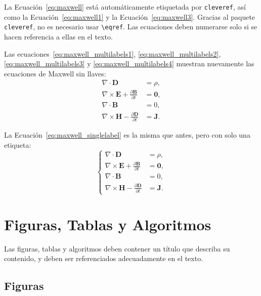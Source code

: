\documentclass[11pt,a4paper]{article}
\begin{document}
La Ecuación~\eqref{eq:maxwell} está automáticamente etiquetada por \texttt{cleveref},
así como la Ecuación~\eqref{eq:maxwell1} y la Ecuación~\eqref{eq:maxwell3}.
Gracias al paquete \verb|cleveref|, no es necesario usar \verb|\eqref|.
Las ecuaciones deben numerarse solo si se hacen referencia a ellas en el texto.

Las ecuaciones~\eqref{eq:maxwell_multilabels1}, \eqref{eq:maxwell_multilabels2}, \eqref{eq:maxwell_multilabels3} y \eqref{eq:maxwell_multilabels4} muestran nuevamente las ecuaciones de Maxwell sin llaves:
\begin{align}
    \nabla\cdot \bm{D} & = \rho, \label{eq:maxwell_multilabels1} \\
    \nabla \times \bm{E} +  \frac{\partial \bm{B}}{\partial t} &= \bm{0}, \label{eq:maxwell_multilabels2} \\
    \nabla\cdot \bm{B} & = 0, \label{eq:maxwell_multilabels3} \\
    \nabla \times \bm{H} - \frac{\partial \bm{D}}{\partial t} &= \bm{J} \label{eq:maxwell_multilabels4}.
\end{align}

La Ecuación~\eqref{eq:maxwell_singlelabel} es la misma que antes,
pero con solo una etiqueta:
\begin{equation}
    \label{eq:maxwell_singlelabel}
    \left\{
    \begin{aligned}
    \nabla\cdot \bm{D} & = \rho, \\
    \nabla \times \bm{E} +  \frac{\partial \bm{B}}{\partial t} &= \bm{0},\\
    \nabla\cdot \bm{B} & = 0, \\
    \nabla \times \bm{H} - \frac{\partial \bm{D}}{\partial t} &= \bm{J}.
    \end{aligned}
    \right.
\end{equation}

\section{Figuras, Tablas y Algoritmos}

Las figuras, tablas y algoritmos deben contener un título que describa su contenido, y deben ser referenciados adecuadamente en el texto.

\subsection{Figuras}
\label{subsec:figures}
\end{document}
